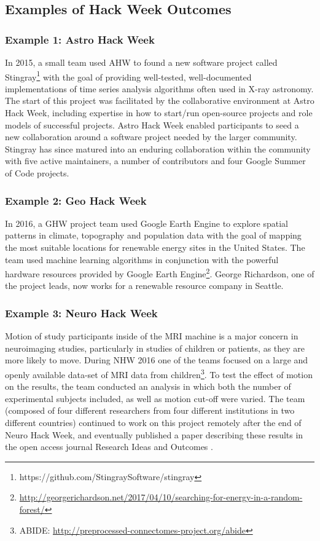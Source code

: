 \subsection*{Examples of Hack Week Outcomes}
\label{sec:outcomes}
\subsubsection*{Example 1: Astro Hack Week}
In 2015, a small team used AHW to found a new software project called Stingray\footnote{https://github.com/StingraySoftware/stingray} with the goal of providing well-tested, well-documented implementations of time series analysis algorithms often used in X-ray astronomy.
The start of this project was facilitated by the collaborative environment at Astro Hack Week, including expertise in how to start/run open-source projects and role models of successful projects. Astro Hack Week enabled participants to seed a new collaboration around a software project needed by the larger community.
Stingray has since matured into an enduring collaboration within the community with five active maintainers, a number of contributors and four Google Summer of Code projects.
\subsubsection*{Example 2: Geo Hack Week}
In 2016, a GHW project team used Google Earth Engine to explore spatial patterns in climate, topography and population data with the goal of mapping the most suitable locations for renewable energy sites in the United States.
The team used machine learning algorithms in conjunction with the powerful hardware resources provided by Google Earth Engine\footnote{\url{http://georgerichardson.net/2017/04/10/searching-for-energy-in-a-random-forest/}}.
George Richardson, one of the project leads, now works for a renewable resource company in Seattle.
\subsubsection*{Example 3: Neuro Hack Week}
Motion of study participants inside of the MRI machine is a major concern in neuroimaging studies, particularly in studies of children or patients, as they are more likely to move.
During NHW 2016 one of the teams focused on a large and openly available data-set of MRI data from children\footnote{ABIDE: \url{http://preprocessed-connectomes-project.org/abide}}.
To test the effect of motion on the results, the team conducted an analysis in which both the number of experimental subjects included, as well as motion cut-off were varied.
The team (composed of four different researchers from four different institutions in two different countries) continued to work on this project remotely after the end of Neuro Hack Week, and eventually published a paper describing these results in the open access journal Research Ideas and Outcomes \cite{leonard2017}.
